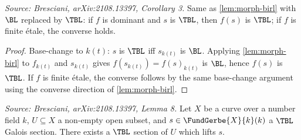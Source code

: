 \begin{corollary}[MorphTBirat]
  \label{cor:morph-tbirl}
  \textit{Source: Bresciani, arXiv:2108.13397, Corollary 3.}
  Same as \cref{lem:morph-birl} with \(\BL\) replaced by \(\TBL\): if \(f\) is
  dominant and \(s\) is \(\TBL\), then \(f(s)\) is \(\TBL\); if \(f\) is finite
  étale, the converse holds.
\end{corollary}

\begin{proof}
  Base-change to \(k(t)\): \(s\) is \(\TBL\) iff \(s_{k(t)}\) is \(\BL\).
  Applying \cref{lem:morph-birl} to \(f_{k(t)}\) and \(s_{k(t)}\) gives
  \(f(s_{k(t)}) = f(s)_{k(t)}\) is \(\BL\), hence \(f(s)\) is \(\TBL\).
  If \(f\) is finite étale, the converse follows by the same base-change argument
  using the converse direction of \cref{lem:morph-birl}.
\end{proof}

\begin{lemma}[NFLift]
  \label{lem:nf-lift}
  \textit{Source: Bresciani, arXiv:2108.13397, Lemma 8.}
  Let \(X\) be a curve over a number field \(k\), \(U \subseteq X\) a non-empty open
  subset, and \(s \in \FundGerbe{X}{k}(k)\) a \(\TBL\) Galois section. There exists
  a \(\TBL\) section of \(U\) which lifts \(s\).
\end{lemma}

